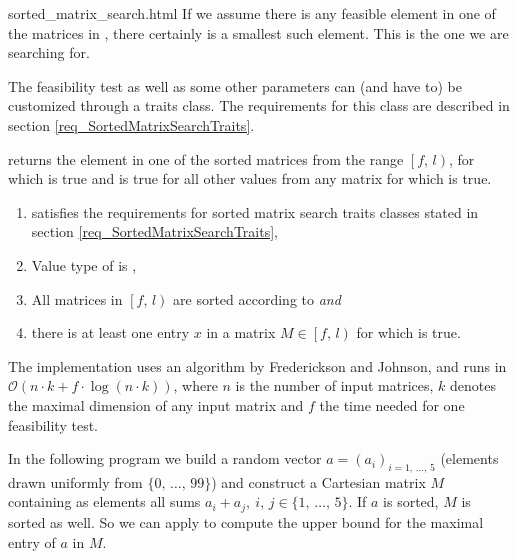 \begin{ccAdvanced}
\begin{ccHtmlClassFile}{sorted_matrix_search.html}
    If we assume there is any feasible element in one of the matrices
    in , there certainly is a smallest such element. This is the one
    we are searching for.

    The feasibility test as well as some other parameters can (and have
    to) be customized through a traits class. The requirements for this
    class are described in section \ref{req_SortedMatrixSearchTraits}.


    \def\ccLongParamLayout{\ccTrue} 
    

    returns the element  in one of the sorted matrices from the
    range $\left[ f,\, l \right)$, for which 
    is true and  is true for all other
     values from any matrix for which  is true.
    
    \begin{enumerate}
    \item {} satisfies the requirements for sorted matrix search
      traits classes stated in section \ref{req_SortedMatrixSearchTraits},
    \item Value type of  is ,
    \item All matrices in $\left[ f,\, l \right)$ are sorted according to
       \textit{and}
    \item there is at least one entry $x$ in a matrix $M \in \left[ f,\, l
      \right)$ for which  is true.
    \end{enumerate}
    
    \ccImplementation The implementation uses an algorithm by
    Frederickson and Johnson\cite{fj-fkppc-83},\cite{fj-gsrsm-84} and
    runs in $\mathcal{O}(n \cdot k + f \cdot \log (n \cdot k))$, where
    $n$ is the number of input matrices, $k$ denotes the maximal
    dimension of any input matrix and $f$ the time needed for one
    feasibility test.
    
    \ccExample In the following program we build a random vector $a =
    (a_i)_{i = 1,\,\ldots,\,5}$ (elements drawn uniformly from $\{
    0,\,\ldots,\,99 \}$) and construct a Cartesian matrix $M$ containing
    as elements all sums $a_i + a_j,\: i,\,j \in \{1,\,\ldots,\,5\}$. If
    $a$ is sorted, $M$ is sorted as well. So we can apply
     to compute the upper bound for the
    maximal entry of $a$ in $M$.
    

\end{ccHtmlClassFile}
\end{ccAdvanced}
